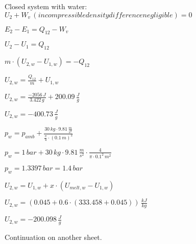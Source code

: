 Closed system with water:  
\( U_2 + W_{v} \, (incompressible density difference negligible) = 0 \)  

\( E_2 - E_1 = Q_{12} - W_{v} \)  

\( U_2 - U_1 = Q_{12} \)  

\( m \cdot (U_{2,w} - U_{1,w}) = -Q_{12} \)  

\( U_{2,w} = \frac{Q_{12}}{m} + U_{1,w} \)  

\( U_{2,w} = \frac{-2056 \, J}{3.422 \, g} + 200.09 \, \frac{J}{g} \)  

\( U_{2,w} = -400.73 \, \frac{J}{g} \)  

\( p_w = p_{amb} + \frac{30 \, kg \cdot 9.81 \, \frac{m}{s^2}}{\frac{\pi}{4} \cdot (0.1 \, m)^2} \)  

\( p_w = 1 \, bar + 30 \, kg \cdot 9.81 \, \frac{m}{s^2} \cdot \frac{4}{\pi \cdot 0.1^2 \, m^2} \)  

\( p_w = 1.3397 \, bar = 1.4 \, bar \)  

\( U_{2,w} = U_{1,w} + x \cdot (U_{melt,w} - U_{1,w}) \)  

\( U_{2,w} = (0.045 + 0.6 \cdot (333.458 + 0.045)) \, \frac{kJ}{kg} \)  

\( U_{2,w} = -200.098 \, \frac{J}{g} \)  

Continuation on another sheet.